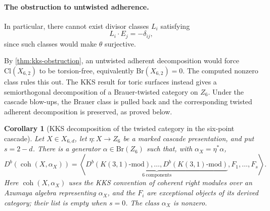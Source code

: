 \documentclass[11pt]{article}
\theoremstyle{plain}
\newtheorem{corollary}[corollary]{Corollary}
\theoremstyle{definition}
\theoremstyle{remark}
\newcommand{\Db}{D^b}
\newcommand{\coh}{\operatorname{coh}}
\newcommand{\Cl}{\mathrm{Cl}}
\newcommand{\Br}{\mathrm{Br}}
\begin{document}
\paragraph{The obstruction to untwisted adherence.}
In particular, there cannot exist divisor classes \(L_i\) satisfying
\[
L_i\cdot E_j=-\delta_{ij},
\]
since such classes would make \(\theta\) surjective.

By \cref{thm:kks-obstruction}, an untwisted adherent decomposition would
force \(\Cl(X_{6,2})\) to be torsion-free, equivalently
\(\Br(X_{6,2})=0\). The computed nonzero class rules this out.
The KKS result for toric surfaces instead gives a semiorthogonal decomposition
of a Brauer-twisted category on \(Z_6\). Under the cascade blow-ups, the
Brauer class is pulled back and the corresponding twisted adherent
decomposition is preserved, as proved below.

\begin{corollary}[KKS decomposition of the twisted category in the six-point cascade]
\label{cor:six-point-twisted-descent}
Let \(X\in X_{6,d}\), let \(\eta:X\to Z_6\) be a marked cascade
presentation, and put \(s=2-d\). There is a generator
\(\alpha\in\Br(Z_6)\) such that, with
\(\alpha_X=\eta^*\alpha\),
\[
\Db(\coh(X,\alpha_X))=
\left\langle
\underbrace{\Db(K(3,1)\text{-mod}),\ldots,
\Db(K(3,1)\text{-mod})}_{6\ \text{components}},
F_1,\ldots,F_s
\right\rangle.
\]
Here \(\coh(X,\alpha_X)\) uses the KKS convention of coherent
right modules over an Azumaya algebra representing \(\alpha_X\),
and the \(F_i\) are
exceptional objects of its derived category; their list is empty
when \(s=0\). The class \(\alpha_X\) is nonzero.
\end{corollary}
\end{document}
